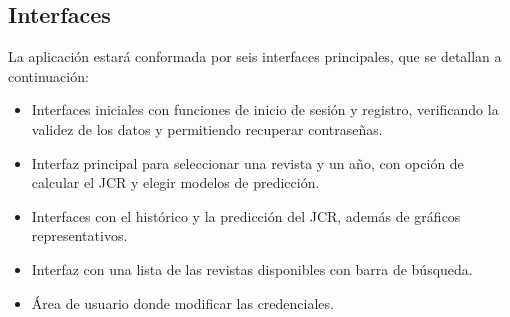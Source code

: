 \subsection{Interfaces}
La aplicación estará conformada por seis interfaces principales, que se detallan a continuación:

\begin{itemize}
    \item Interfaces iniciales con funciones de inicio de sesión y registro, verificando la validez de los datos y permitiendo recuperar contraseñas.
    \item Interfaz principal para seleccionar una revista y un año, con opción de calcular el JCR y elegir modelos de predicción.
    \item Interfaces con el histórico y la predicción del JCR, además de gráficos representativos.
    \item Interfaz con una lista de las revistas disponibles con barra de búsqueda.
    \item Área de usuario donde modificar las credenciales.
\end{itemize}


